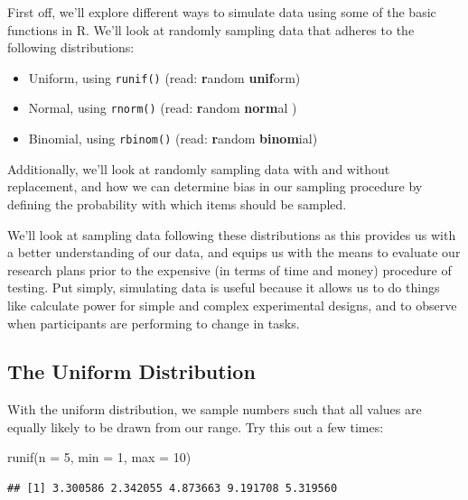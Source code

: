 \documentclass[
]{book}
\newenvironment{Shaded}{\begin{snugshade}}{\end{snugshade}}
\newcommand{\AttributeTok}[1]{\textcolor[rgb]{0.77,0.63,0.00}{#1}}
\newcommand{\DecValTok}[1]{\textcolor[rgb]{0.00,0.00,0.81}{#1}}
\newcommand{\FunctionTok}[1]{\textcolor[rgb]{0.00,0.00,0.00}{#1}}
\newcommand{\NormalTok}[1]{#1}
\providecommand{\tightlist}{%
  \setlength{\itemsep}{0pt}\setlength{\parskip}{0pt}}
\begin{document}
First off, we'll explore different ways to simulate data using some of the basic functions in R. We'll look at randomly sampling data that adheres to the following distributions:

\begin{itemize}
\tightlist
\item
  Uniform, using \texttt{runif()} (read: \textbf{r}andom \textbf{unif}orm)
\item
  Normal, using \texttt{rnorm()} (read: \textbf{r}andom \textbf{norm}al )
\item
  Binomial, using \texttt{rbinom()} (read: \textbf{r}andom \textbf{binom}ial)
\end{itemize}

Additionally, we'll look at randomly sampling data with and without replacement, and how we can determine bias in our sampling procedure by defining the probability with which items should be sampled.

We'll look at sampling data following these distributions as this provides us with a better understanding of our data, and equips us with the means to evaluate our research plans prior to the expensive (in terms of time and money) procedure of testing. Put simply, simulating data is useful because it allows us to do things like calculate power for simple and complex experimental designs, and to observe when participants are performing to change in tasks.

\hypertarget{the-uniform-distribution}{%
\subsection{The Uniform Distribution}\label{the-uniform-distribution}}

With the uniform distribution, we sample numbers such that all values are equally likely to be drawn from our range. Try this out a few times:

\begin{Shaded}
\begin{Highlighting}[]
\FunctionTok{runif}\NormalTok{(}\AttributeTok{n =} \DecValTok{5}\NormalTok{, }\AttributeTok{min =} \DecValTok{1}\NormalTok{, }\AttributeTok{max =} \DecValTok{10}\NormalTok{)}
\end{Highlighting}
\end{Shaded}

\begin{verbatim}
## [1] 3.300586 2.342055 4.873663 9.191708 5.319560
\end{verbatim}
\end{document}
